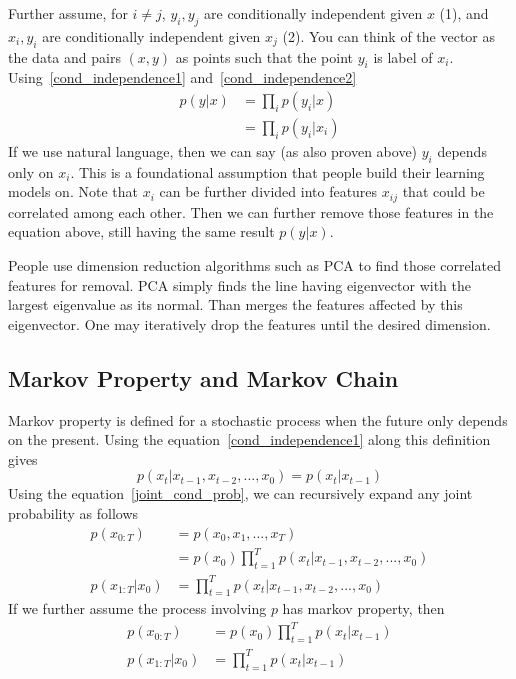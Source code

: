 \documentclass{book}
\numberwithin{equation}{subsection}
\begin{document}
Further assume, for $i \neq j$, $y_i, y_j$ are conditionally independent given $x$ (1), and $x_i, y_i$ are conditionally independent given $x_j$ (2). You can think of the vector as the data and pairs $(x,y)$ as points such that the point $y_i$ is label of $x_i$. Using~\ref{cond_independence1} and~\ref{cond_independence2}
\begin{align}
    p(y|x) &= \prod_i p(y_i|x)\\
           &= \prod_i p(y_i|x_i)
\end{align}
If we use natural language, then we can say (as also proven above) $y_i$ depends only on $x_i$. This is a foundational assumption that people build their learning models on. Note that $x_i$ can be further divided into features $x_{ij}$ that could be correlated among each other. Then we can further remove those features in the equation above, still having the same result $p(y|x)$. 

People use dimension reduction algorithms such as PCA to find those correlated features for removal. PCA simply finds the line having eigenvector with the largest eigenvalue as its normal. Than merges the features affected by this eigenvector. One may iteratively drop the features until the desired dimension.
\subsection{Markov Property and Markov Chain}
Markov property is defined for a stochastic process when the future only depends on the present. Using the equation~\ref{cond_independence1} along this definition gives
\begin{equation}
    p(x_t|x_{t-1},x_{t-2},...,x_0) = p(x_t|x_{t-1})
\end{equation}
Using the equation~\ref{joint_cond_prob}, we can recursively expand any joint probability as follows
\begin{align}
    p(x_{0:T}) &= p(x_0,x_1,...,x_T) \\
    &= p(x_0)\prod_{t=1}^T p(x_t|x_{t-1},x_{t-2},...,x_0)\\
    p(x_{1:T}|x_0) &= \prod_{t=1}^T p(x_t|x_{t-1},x_{t-2},...,x_0)
\end{align}
If we further assume the process involving $p$ has markov property, then
\begin{align}
    p(x_{0:T}) &= p(x_0)\prod_{t=1}^T p(x_t|x_{t-1}) \label{markov_chain_joint}\\
    p(x_{1:T}|x_0) &= \prod_{t=1}^T p(x_t|x_{t-1}) \label{markov_chain_cond}
\end{align}
\end{document}
